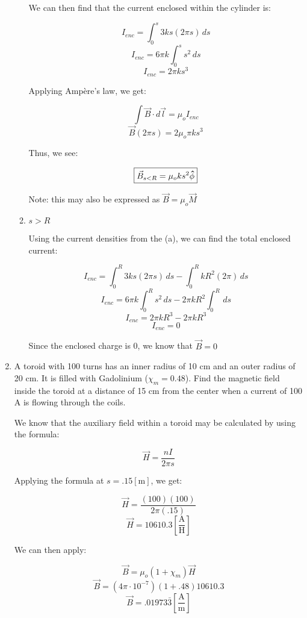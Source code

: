 \begin{enumerate}
\begin{enumerate}
        We can then find that the current enclosed within the cylinder is:

        $$I_{enc}=\int_0^s 3ks(2\pi s)\,ds$$
        $$I_{enc}=6\pi k\int_0^s s^2\,ds$$
        $$I_{enc}=2\pi ks^3$$

        Applying Amp\`ere's law, we get:

        $$\int\vec{B}\cdot d\vec{l}=\mu_oI_{enc}$$
        $$\vec{B}(2\pi s)=2\mu_o\pi k s^3$$

        Thus, we see:

        $$\boxed{\vec{B}_{s<R}=\mu_oks^2\bold{\hat{\phi}}}$$

        Note: this may also be expressed as $\vec{B}=\mu_o\vec{M}$

      \item $s>R$

        Using the current densities from the (a), we can find the total enclosed current:

        $$I_{enc}=\int_0^R 3ks(2\pi s)\,ds-\int_0^R kR^2(2\pi)\,ds$$
        $$I_{enc}=6\pi k\int_0^R s^2\,ds-2\pi kR^2\int_0^R\,ds$$
        $$I_{enc}=2\pi kR^3-2\pi kR^3$$
        $$I_{enc}=0$$

        Since the enclosed charge is 0, we know that $\boxed{\vec{B}=0}$

    \end{enumerate}

  \item A toroid with 100 turns has an inner radius of 10 cm and an outer radius of 20 cm. It is filled with Gadolinium ($\chi_m=0.48$). Find the magnetic field inside the toroid at a distance of 15 cm from the center when a current of 100 A is flowing through the coils.

    We know that the auxiliary field within a toroid may be calculated by using the formula:

    $$\vec{H}=\frac{nI}{2\pi s}$$

    Applying the formula at $s=.15[\si{\meter}]$, we get:

    $$\vec{H}=\frac{(100)(100)}{2\pi (.15)}$$
    $$\vec{H}=10610.3\left[ \frac{\si{\ampere}}{\si{\henry}} \right]$$

    We can then apply:

    $$\vec{B}=\mu_o(1+\chi_m)\vec{H}$$
    $$\vec{B}=(4\pi\cdot10^{-7})(1+.48)10610.3$$
    $$\boxed{\vec{B}=.01973\bar{3}\left[ \frac{\si{\ampere}}{\si{\meter}} \right]}$$

\end{enumerate}



